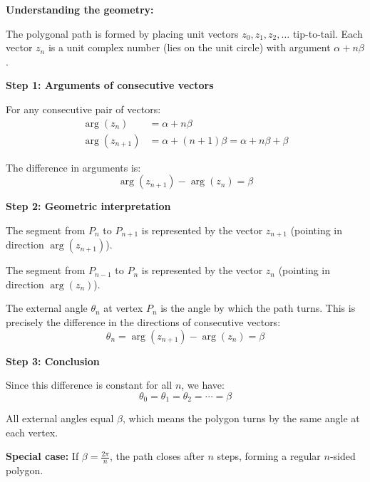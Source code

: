 \begin{solution}[Sketch]
\textbf{Understanding the geometry:}

The polygonal path is formed by placing unit vectors $z_0, z_1, z_2, \ldots$ tip-to-tail. Each vector $z_n$ is a unit complex number (lies on the unit circle) with argument $\alpha + n\beta$.

\textbf{Step 1: Arguments of consecutive vectors}

For any consecutive pair of vectors:
\begin{align*}
\arg(z_n) &= \alpha + n\beta\\
\arg(z_{n+1}) &= \alpha + (n+1)\beta = \alpha + n\beta + \beta
\end{align*}

The difference in arguments is:
$$\arg(z_{n+1}) - \arg(z_n) = \beta$$

\textbf{Step 2: Geometric interpretation}

The segment from $P_n$ to $P_{n+1}$ is represented by the vector $z_{n+1}$ (pointing in direction $\arg(z_{n+1})$).

The segment from $P_{n-1}$ to $P_n$ is represented by the vector $z_n$ (pointing in direction $\arg(z_n)$).

The external angle $\theta_n$ at vertex $P_n$ is the angle by which the path turns. This is precisely the difference in the directions of consecutive vectors:
$$\theta_n = \arg(z_{n+1}) - \arg(z_n) = \beta$$

\textbf{Step 3: Conclusion}

Since this difference is constant for all $n$, we have:
$$\theta_0 = \theta_1 = \theta_2 = \cdots = \beta$$

All external angles equal $\beta$, which means the polygon turns by the same angle at each vertex.

\textbf{Special case:} If $\beta = \frac{2\pi}{n}$, the path closes after $n$ steps, forming a regular $n$-sided polygon.

\vspace{0.5em}
\begin{center}
\end{center}
\end{solution}
